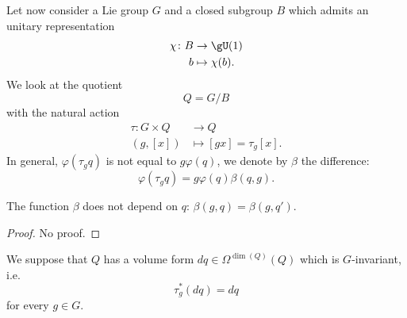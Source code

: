Let now consider a Lie group $G$ and a closed subgroup $B$ which admits an unitary representation
\begin{equation}
	\begin{aligned}
		\chi\colon B&\to \gU(1) \\
		b&\mapsto \chi(b).
	\end{aligned}
\end{equation}
We look at the quotient
\begin{equation}
	Q=G/B
\end{equation}
with the natural action
\begin{equation}
	\begin{aligned}
		\tau\colon G\times Q&\to Q \\
		(g,[x])&\mapsto [gx]=\tau_g[x].
	\end{aligned}
\end{equation}
In general, $\varphi(\tau_gq)$ is not equal to $g\varphi(q)$, we denote by $\beta$ the difference:
\begin{equation}			\label{EqDefBetavptaunotEqual}
	\varphi(\tau_g q)=g\varphi(q)\beta(q,g).
\end{equation}
\begin{lemma}
	The function $\beta$ does not depend on $q$: $\beta(g,q)=\beta(g,q')$.
\end{lemma}
\begin{proof}
	No proof.
\end{proof}

We suppose that $Q$ has a volume form $dq\in\Omega^{\dim(Q)}(Q)$ which is $G$-invariant, i.e.
\begin{equation}
	\tau^*_g(dq)=dq
\end{equation}
for every $g\in G$.


